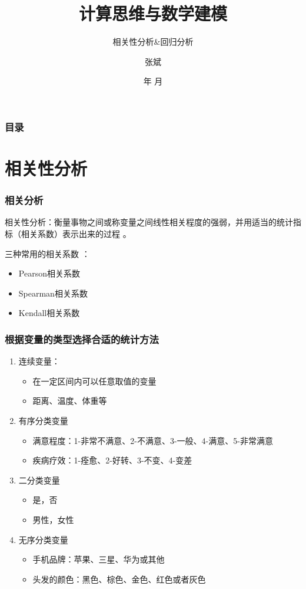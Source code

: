 \documentclass[dvipsnames, svgnames, x11names]{beamer}
\title{计算思维与数学建模}
\subtitle{相关性分析\&回归分析}
\author{张斌}
\institute[理工系]{河北农业大学 理工系}
\date{\the\year 年 \the\month 月}
\begin{document}
\maketitle


\begin{frame}
    \frametitle{目录}
    \tableofcontents
\end{frame}


\section{相关性分析}


\begin{frame}
    \frametitle{相关分析}
    相关性分析：衡量事物之间或称变量之间线性相关程度的强弱，并用适当的统计指标（相关系数）表示出来的过程 。

    三种常用的相关系数 ：

    \begin{itemize}
      \item Pearson相关系数
      \item Spearman相关系数
      \item Kendall相关系数
    \end{itemize}
\end{frame}




\begin{frame}
    \frametitle{根据变量的类型选择合适的统计方法}
    \begin{enumerate}
      \item 连续变量：
        \begin{itemize}
          \item 在一定区间内可以任意取值的变量
          \item 距离、温度、体重等
        \end{itemize}
      \item 有序分类变量
        \begin{itemize}
          \item 满意程度：1-非常不满意、2-不满意、3-一般、4-满意、5-非常满意
          \item 疾病疗效：1-痊愈、2-好转、3-不变、4-变差
        \end{itemize}
      \item 二分类变量
        \begin{itemize}
          \item 是，否
          \item 男性，女性
        \end{itemize}
      \item 无序分类变量
        \begin{itemize}
          \item 手机品牌：苹果、三星、华为或其他
          \item 头发的颜色：黑色、棕色、金色、红色或者灰色
        \end{itemize}
    \end{enumerate}
\end{frame}
\end{document}
